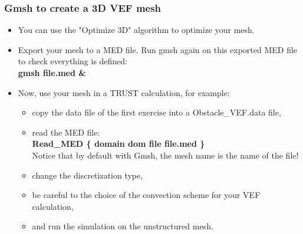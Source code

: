 \documentclass[10pt, hyperref={unicode=true,pdfusetitle, bookmarks=true,bookmarksnumbered=false,bookmarksopen=false, breaklinks=false,pdfborder={0 0l 1},backref=true,colorlinks=true,linkcolor=darkblue,pageanchor}]{beamer}
\begin{document}
\begin{frame}
\frametitle{Gmsh to create a 3D VEF mesh}
\begin{block}{}

\begin{itemize}
\item You can use the "Optimize 3D" algorithm to optimize your mesh.

\item Export your mesh to a MED file. Run gmsh again on this exported MED file to check everything is defined:\\
\textbf{gmsh file.med \&}

\item Now, use your mesh in a TRUST calculation, for example:
        \begin{itemize}
        \item [$\circ$] copy the data file of the first exercise into a Obstacle\_VEF.data file, \\
        \item [$\circ$] read the MED file:\\
                        \textbf{Read\_MED \{ domain dom file file.med \} } \\
                        Notice that by default with Gmsh, the mesh name is the name of the file!
        \item [$\circ$] change the discretization type,
        \item [$\circ$] be careful to the choice of the convection scheme for your VEF calculation,
        \item [$\circ$] and run the simulation on the unstructured mesh.
        \end{itemize}
\end{itemize}

\end{block}
\end{frame}
\end{document}
